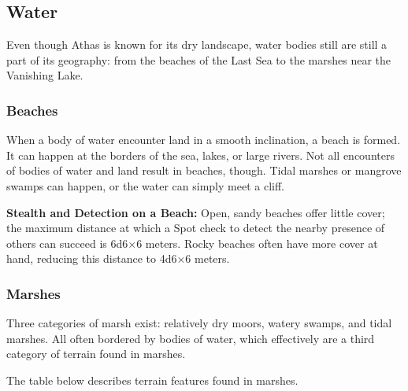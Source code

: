 \subsection{Water}
Even though Athas is known for its dry landscape, water bodies still are still a part of its geography: from the beaches of the Last Sea to the marshes near the Vanishing Lake.


\subsubsection{Beaches}
When a body of water encounter land in a smooth inclination, a beach is formed. It can happen at the borders of the sea, lakes, or large rivers. Not all encounters of bodies of water and land result in beaches, though. Tidal marshes or mangrove swamps can happen, or the water can simply meet a cliff.


\textbf{Stealth and Detection on a Beach:} Open, sandy beaches offer little cover; the maximum distance at which a Spot check to detect the nearby presence of others can succeed is 6d6$\times$6 meters. Rocky beaches often have more cover at hand, reducing this distance to 4d6$\times$6 meters.



\subsubsection{Marshes}
Three categories of marsh exist: relatively dry moors, watery swamps, and tidal marshes. All often bordered by bodies of water, which effectively are a third category of terrain found in marshes.

The table below describes terrain features found in marshes.


